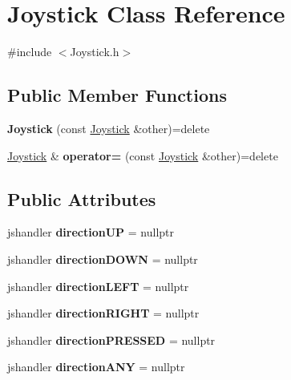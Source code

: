 \hypertarget{class_joystick}{}\section{Joystick Class Reference}
\label{class_joystick}


{\ttfamily \#include $<$Joystick.\+h$>$}

\subsection*{Public Member Functions}
\begin{DoxyCompactItemize}
\item 
{\bfseries Joystick} (const \hyperlink{class_joystick}{Joystick} \&other)=delete\hypertarget{class_joystick_aee767adfa96c50ebb6ca1af13ddb6187}{}\label{class_joystick_aee767adfa96c50ebb6ca1af13ddb6187}

\item 
\hyperlink{class_joystick}{Joystick} \& {\bfseries operator=} (const \hyperlink{class_joystick}{Joystick} \&other)=delete\hypertarget{class_joystick_ad5b1112a556aba93875e60e70a2f6643}{}\label{class_joystick_ad5b1112a556aba93875e60e70a2f6643}

\end{DoxyCompactItemize}
\subsection*{Public Attributes}
\begin{DoxyCompactItemize}
\item 
jshandler {\bfseries direction\+UP} = nullptr\hypertarget{class_joystick_a24b286e28a1e3ada2bc42c4b1ef16339}{}\label{class_joystick_a24b286e28a1e3ada2bc42c4b1ef16339}

\item 
jshandler {\bfseries direction\+D\+O\+WN} = nullptr\hypertarget{class_joystick_aca32b8875e35bd9af63065e0d5dfafb9}{}\label{class_joystick_aca32b8875e35bd9af63065e0d5dfafb9}

\item 
jshandler {\bfseries direction\+L\+E\+FT} = nullptr\hypertarget{class_joystick_a0a7fa96faefa92d2f2e09251b460b5ed}{}\label{class_joystick_a0a7fa96faefa92d2f2e09251b460b5ed}

\item 
jshandler {\bfseries direction\+R\+I\+G\+HT} = nullptr\hypertarget{class_joystick_a6fcd661de0e47977ebfddd1950004bd1}{}\label{class_joystick_a6fcd661de0e47977ebfddd1950004bd1}

\item 
jshandler {\bfseries direction\+P\+R\+E\+S\+S\+ED} = nullptr\hypertarget{class_joystick_ab7b8181af7f4b77fe567c9fe2b00cf89}{}\label{class_joystick_ab7b8181af7f4b77fe567c9fe2b00cf89}

\item 
jshandler {\bfseries direction\+A\+NY} = nullptr\hypertarget{class_joystick_a9699d1491b81b53353a30cfc675ef188}{}\label{class_joystick_a9699d1491b81b53353a30cfc675ef188}

\end{DoxyCompactItemize}
